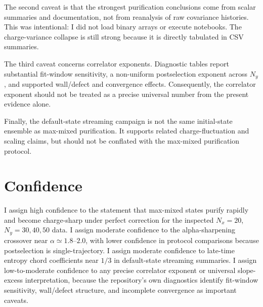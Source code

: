\documentclass[aps,prb,onecolumn,nofootinbib,superscriptaddress]{revtex4-2}
\begin{document}
The second caveat is that the strongest purification conclusions come from scalar summaries and documentation, not from reanalysis of raw covariance histories.  This was intentional: I did not load binary arrays or execute notebooks.  The charge-variance collapse is still strong because it is directly tabulated in CSV summaries.

The third caveat concerns correlator exponents.  Diagnostic tables report substantial fit-window sensitivity, a non-uniform postselection exponent across $N_y$, and supported wall/defect and convergence effects.  Consequently, the correlator exponent should not be treated as a precise universal number from the present evidence alone.

Finally, the default-state streaming campaign is not the same initial-state ensemble as max-mixed purification.  It supports related charge-fluctuation and scaling claims, but should not be conflated with the max-mixed purification protocol.

\section{Confidence}

I assign high confidence to the statement that max-mixed states purify rapidly and become charge-sharp under perfect correction for the inspected $N_x=20$, $N_y=30,40,50$ data.  I assign moderate confidence to the alpha-sharpening crossover near $\alpha\simeq1.8$--$2.0$, with lower confidence in protocol comparisons because postselection is single-trajectory.  I assign moderate confidence to late-time entropy chord coefficients near $1/3$ in default-state streaming summaries.  I assign low-to-moderate confidence to any precise correlator exponent or universal slope-excess interpretation, because the repository's own diagnostics identify fit-window sensitivity, wall/defect structure, and incomplete convergence as important caveats.
\end{document}
